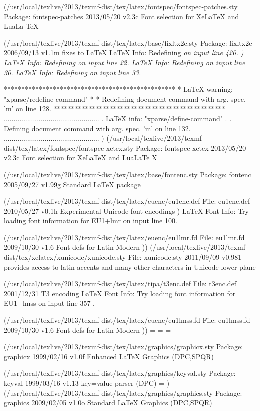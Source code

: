 (/usr/local/texlive/2013/texmf-dist/tex/latex/fontspec/fontspec-patches.sty
Package: fontspec-patches 2013/05/20 v2.3c Font selection for XeLaTeX and LuaLa
TeX

(/usr/local/texlive/2013/texmf-dist/tex/latex/base/fixltx2e.sty
Package: fixltx2e 2006/09/13 v1.1m fixes to LaTeX
LaTeX Info: Redefining \em on input line 420.
)
LaTeX Info: Redefining \em on input line 22.
LaTeX Info: Redefining \emph on input line 30.
LaTeX Info: Redefining \- on input line 33.

*************************************************
* LaTeX warning: "xparse/redefine-command"
* 
* Redefining document command \oldstylenums with arg. spec. 'm' on line 128.
*************************************************
.................................................
. LaTeX info: "xparse/define-command"
. 
. Defining document command \liningnums with arg. spec. 'm' on line 132.
.................................................
) (/usr/local/texlive/2013/texmf-dist/tex/latex/fontspec/fontspec-xetex.sty
Package: fontspec-xetex 2013/05/20 v2.3c Font selection for XeLaTeX and LuaLaTe
X

(/usr/local/texlive/2013/texmf-dist/tex/latex/base/fontenc.sty
Package: fontenc 2005/09/27 v1.99g Standard LaTeX package

(/usr/local/texlive/2013/texmf-dist/tex/latex/euenc/eu1enc.def
File: eu1enc.def 2010/05/27 v0.1h Experimental Unicode font encodings
)
LaTeX Font Info:    Try loading font information for EU1+lmr on input line 100.


(/usr/local/texlive/2013/texmf-dist/tex/latex/euenc/eu1lmr.fd
File: eu1lmr.fd 2009/10/30 v1.6 Font defs for Latin Modern
))
(/usr/local/texlive/2013/texmf-dist/tex/xelatex/xunicode/xunicode.sty
File: xunicode.sty 2011/09/09 v0.981 provides access to latin accents and many 
other characters in Unicode lower plane

(/usr/local/texlive/2013/texmf-dist/tex/latex/tipa/t3enc.def
File: t3enc.def 2001/12/31 T3 encoding
LaTeX Font Info:    Try loading font information for EU1+lmss on input line 357
.

(/usr/local/texlive/2013/texmf-dist/tex/latex/euenc/eu1lmss.fd
File: eu1lmss.fd 2009/10/30 v1.6 Font defs for Latin Modern
))
\tipaTiiicode=
\tipasavetokens=
\tipachecktokens=

(/usr/local/texlive/2013/texmf-dist/tex/latex/graphics/graphicx.sty
Package: graphicx 1999/02/16 v1.0f Enhanced LaTeX Graphics (DPC,SPQR)

(/usr/local/texlive/2013/texmf-dist/tex/latex/graphics/keyval.sty
Package: keyval 1999/03/16 v1.13 key=value parser (DPC)
\KV@toks@=
)
(/usr/local/texlive/2013/texmf-dist/tex/latex/graphics/graphics.sty
Package: graphics 2009/02/05 v1.0o Standard LaTeX Graphics (DPC,SPQR)

